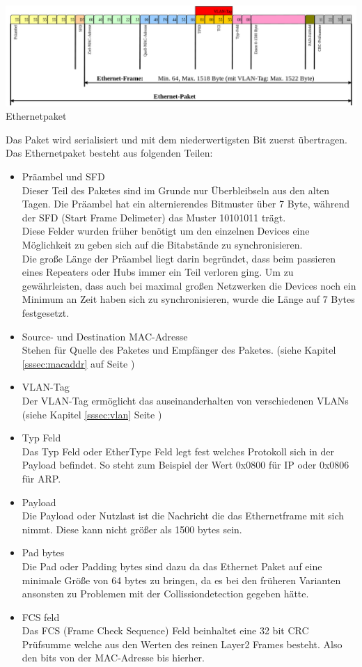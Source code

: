 \documentclass[12pt,a4paper]{report}
\begin{document}
\begin{center}
\includegraphics[scale=0.35]{../docs/tarkes/pics/Ethernetpaket.png}
Ethernetpaket
\end{center}

Das Paket wird serialisiert und mit dem niederwertigsten Bit zuerst übertragen. Das Ethernetpaket besteht aus folgenden Teilen:
\begin{itemize}
\item Präambel und SFD\\
Dieser Teil des Paketes sind im Grunde nur Überbleibseln aus den alten Tagen. Die Präambel hat ein alternierendes Bitmuster über 7 Byte, während der SFD (Start Frame Delimeter) das Muster 10101011 trägt.\\
Diese Felder wurden früher benötigt um den einzelnen Devices eine Möglichkeit zu geben sich auf die Bitabstände zu synchronisieren.\\
Die große Länge der Präambel liegt darin begründet, dass beim passieren eines Repeaters oder Hubs immer ein Teil verloren ging. Um zu gewährleisten, dass auch bei maximal großen Netzwerken die Devices noch ein Minimum an Zeit haben sich zu synchronisieren, wurde die Länge auf 7 Bytes festgesetzt. 
\item Source- und Destination MAC-Adresse\\
Stehen für Quelle des Paketes und Empfänger des Paketes. (siehe Kapitel \ref{sssec:macaddr} auf Seite \pageref{sssec:macaddr})
\item VLAN-Tag\\
Der VLAN-Tag ermöglicht das auseinanderhalten von verschiedenen VLANs (siehe Kapitel \ref{sssec:vlan} Seite \pageref{sssec:vlan})
\item Typ Feld\\
Das Typ Feld oder EtherType Feld legt fest welches Protokoll sich in der Payload befindet. So steht zum Beispiel der Wert 0x0800 für IP oder 0x0806 für ARP.
\item Payload\\
Die Payload oder Nutzlast ist die Nachricht die das Ethernetframe mit sich nimmt. Diese kann nicht größer als 1500 bytes sein.
\item Pad bytes\\
Die Pad oder Padding bytes sind dazu da das Ethernet Paket auf eine minimale Größe von 64 bytes zu bringen, da es bei den früheren Varianten ansonsten zu Problemen mit der Collissiondetection gegeben hätte.
\item FCS feld\\
Das FCS (Frame Check Sequence) Feld beinhaltet eine 32 bit CRC Prüfsumme welche aus den Werten des reinen Layer2 Frames besteht. Also den bits von der MAC-Adresse bis hierher.
\end{itemize}
\end{document}
